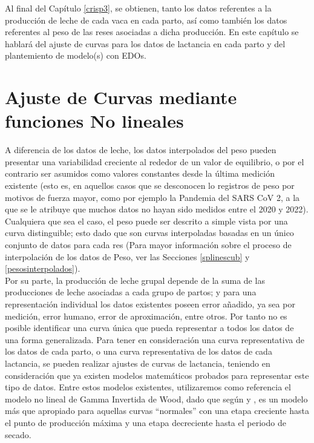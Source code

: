 Al final del Capítulo \ref{crisp3}, se obtienen, tanto los datos referentes a la producción de leche de cada vaca en cada parto, así como también los datos referentes al peso de las reses asociadas a dicha producción. En este capítulo se hablará del ajuste de curvas para los datos de lactancia en cada parto y del plantemiento de modelo(s) con EDOs.

\section{Ajuste de Curvas mediante funciones No lineales}\label{ajustenonlin}

A diferencia de los datos de leche, los datos interpolados del peso pueden presentar una variabilidad  creciente al rededor de un valor de equilibrio, o por el contrario ser asumidos como valores constantes desde la última medición existente (esto es, en aquellos casos que se desconocen lo registros de peso por motivos de fuerza mayor, como por ejemplo la Pandemia del SARS CoV 2, a la que se le atribuye que muchos datos no hayan sido medidos entre el 2020 y 2022). Cualquiera que sea el caso, el peso puede ser descrito a simple vista por una curva distinguible; esto dado que son curvas interpoladas basadas en un único conjunto de datos para cada res (Para mayor información sobre el proceso de interpolación de los datos de Peso, ver las Secciones \ref{splinescub} y \ref{pesosinterpolados}).\\

Por su parte, la producción de leche grupal depende de la suma de las producciones de leche asociadas a cada grupo de partos; y para una representación individual los datos existentes poseen error añadido, ya sea por medición, error humano, error de aproximación, entre otros. Por tanto no es posible identificar una curva única que pueda representar a todos los datos de una forma generalizada. Para tener en consideración una curva representativa de los datos de cada parto, o una curva representativa de los datos de cada lactancia, se pueden realizar ajustes de curvas de lactancia, teniendo en consideración que ya existen modelos matemáticos probados para representar este tipo de datos. Entre estos modelos existentes, utilizaremos como referencia el modelo no lineal de Gamma Invertida de Wood, dado que según \cite{silvestre} y \cite{shanks}, es un modelo más que apropiado para aquellas curvas ``normales'' con una etapa creciente hasta el punto de producción máxima y una etapa decreciente hasta el periodo de secado.\\
 
